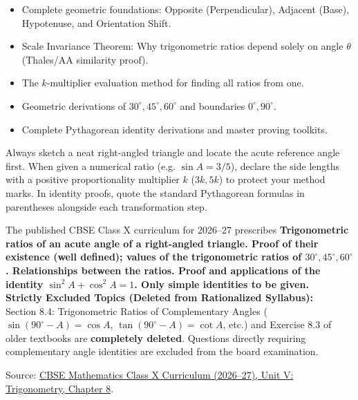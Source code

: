 \documentclass[10pt,a4paper]{article}
\begin{document}
\vspace{2.5mm}
\begin{minipage}[t]{0.485\textwidth}
  \begin{conceptBox}[title=What this handbook includes,fonttitle=\bfseries\color{navy}]
    \begin{itemize}
      \item Complete geometric foundations: Opposite (Perpendicular), Adjacent (Base), Hypotenuse, and Orientation Shift.
      \item Scale Invariance Theorem: Why trigonometric ratios depend solely on angle $\theta$ (Thales/AA similarity proof).
      \item The $k$-multiplier evaluation method for finding all ratios from one.
      \item Geometric derivations of $30^\circ, 45^\circ, 60^\circ$ and boundaries $0^\circ, 90^\circ$.
      \item Complete Pythagorean identity derivations and master proving toolkits.
    \end{itemize}
  \end{conceptBox}
\end{minipage}\hfill
\begin{minipage}[t]{0.485\textwidth}
  \begin{formulaBox}[title=How to use it for maximum marks,fonttitle=\bfseries\color{navy}]
    \raggedright Always sketch a neat right-angled triangle and locate the acute reference angle first. When given a numerical ratio (e.g. $\sin A = 3/5$), declare the side lengths with a positive proportionality multiplier $k$ ($3k, 5k$) to protect your method marks. In identity proofs, quote the standard Pythagorean formulas in parentheses alongside each transformation step.
  \end{formulaBox}
\end{minipage}

\vspace{1.5mm}
\begin{warningBox}[title=Official syllabus scope (CBSE Class X 2026--27),fonttitle=\bfseries\color{navy}]
  The published CBSE Class X curriculum for 2026--27 prescribes \textbf{Trigonometric ratios of an acute angle of a right-angled triangle. Proof of their existence (well defined); values of the trigonometric ratios of $30^\circ, 45^\circ, 60^\circ$. Relationships between the ratios. Proof and applications of the identity $\sin^2 A + \cos^2 A = 1$. Only simple identities to be given.} \\
  \textbf{Strictly Excluded Topics (Deleted from Rationalized Syllabus):} \\
  Section 8.4: Trigonometric Ratios of Complementary Angles ($\sin(90^\circ-A)=\cos A$, $\tan(90^\circ-A)=\cot A$, etc.) and Exercise 8.3 of older textbooks are \textbf{completely deleted}. Questions directly requiring complementary angle identities are excluded from the board examination.\par
  {\scriptsize Source: \href{https://cbseacademic.nic.in/web_material/CurriculumMain27/SecPart1/Maths_SecP1X_2026-27.pdf}{CBSE Mathematics Class X Curriculum (2026--27), Unit V: Trigonometry, Chapter 8}.}
\end{warningBox}
\end{document}

